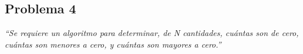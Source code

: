 \subsection{Problema 4}

\textit {“Se requiere un algoritmo para determinar, de N cantidades, cuántas son de cero, cuántas son menores a cero, y cuántas son mayores a cero.”}

